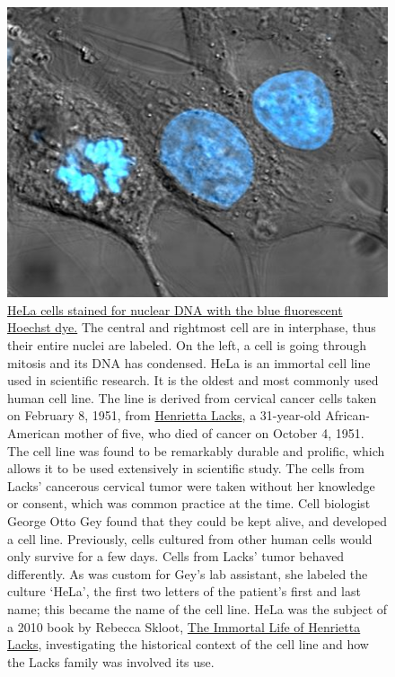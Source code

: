 \begin{figure}

{\centering \includegraphics[width=0.7\linewidth]{./figures/cells/HeLa_cells_stained_with_Hoechst_33258} 

}

\caption{\href{https://commons.wikimedia.org/wiki/File:HeLa_cells_stained_with_Hoechst_33258.jpg}{HeLa cells stained for nuclear DNA with the blue fluorescent Hoechst dye.} The central and rightmost cell are in interphase, thus their entire nuclei are labeled. On the left, a cell is going through mitosis and its DNA has condensed. HeLa is an immortal cell line used in scientific research. It is the oldest and most commonly used human cell line. The line is derived from cervical cancer cells taken on February 8, 1951, from \href{https://en.wikipedia.org/wiki/Henrietta_Lacks}{Henrietta Lacks}, a 31-year-old African-American mother of five, who died of cancer on October 4, 1951. The cell line was found to be remarkably durable and prolific, which allows it to be used extensively in scientific study. The cells from Lacks' cancerous cervical tumor were taken without her knowledge or consent, which was common practice at the time. Cell biologist George Otto Gey found that they could be kept alive, and developed a cell line. Previously, cells cultured from other human cells would only survive for a few days. Cells from Lacks' tumor behaved differently. As was custom for Gey's lab assistant, she labeled the culture `HeLa', the first two letters of the patient's first and last name; this became the name of the cell line. HeLa was the subject of a 2010 book by Rebecca Skloot, \href{https://en.wikipedia.org/wiki/The_Immortal_Life_of_Henrietta_Lacks}{The Immortal Life of Henrietta Lacks}, investigating the historical context of the cell line and how the Lacks family was involved its use.}\label{fig:helacellsstained}
\end{figure}

